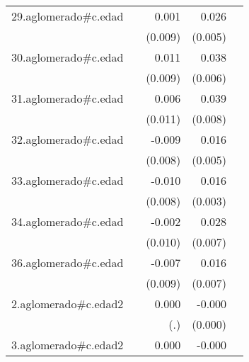 {\begin{longtable}{l*{4}{D{.}{.}{-1}}}
\addlinespace
29.aglomerado#c.edad&                     &       0.001         &       0.026\sym{***}&                     \\
            &                     &     (0.009)         &     (0.005)         &                     \\
\addlinespace
30.aglomerado#c.edad&                     &       0.011         &       0.038\sym{***}&                     \\
            &                     &     (0.009)         &     (0.006)         &                     \\
\addlinespace
31.aglomerado#c.edad&                     &       0.006         &       0.039\sym{***}&                     \\
            &                     &     (0.011)         &     (0.008)         &                     \\
\addlinespace
32.aglomerado#c.edad&                     &      -0.009         &       0.016\sym{***}&                     \\
            &                     &     (0.008)         &     (0.005)         &                     \\
\addlinespace
33.aglomerado#c.edad&                     &      -0.010         &       0.016\sym{***}&                     \\
            &                     &     (0.008)         &     (0.003)         &                     \\
\addlinespace
34.aglomerado#c.edad&                     &      -0.002         &       0.028\sym{***}&                     \\
            &                     &     (0.010)         &     (0.007)         &                     \\
\addlinespace
36.aglomerado#c.edad&                     &      -0.007         &       0.016\sym{*}  &                     \\
            &                     &     (0.009)         &     (0.007)         &                     \\
\addlinespace
2.aglomerado#c.edad2&                     &       0.000         &      -0.000\sym{*}  &                     \\
            &                     &         (.)         &     (0.000)         &                     \\
\addlinespace
3.aglomerado#c.edad2&                     &       0.000         &      -0.000\sym{***}&                     \\

\end{longtable}}
